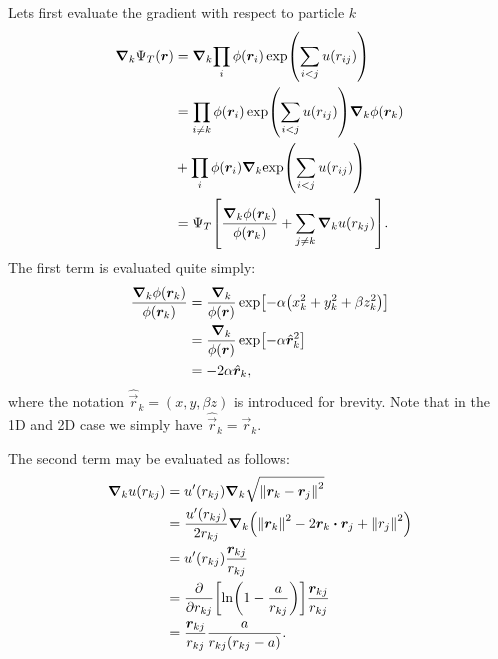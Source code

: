 \documentclass[twocolumn]{article}
\begin{document}
Lets first evaluate the gradient with respect to particle $k$
\begin{align}
    \begin{split}
    \grad_k{\Psi_T(\bm r)}  
    &= \grad_k{\prod_i \phi(\bm r_i)\exp(\sum_{i<j}u(r_{ij}))}\\
    &= \prod_{i\neq k} \phi(\bm r_i)\exp(\sum_{i<j}u(r_{ij}))\grad_k{\phi(\bm
    r_k)}\\
    &+ \prod_{i} \phi(\bm r_i)\grad_k{\exp(\sum_{i<j}u(r_{ij}))}\\
    &= \Psi_T\qty[\frac{\grad_k \phi(\bm r_k)}{\phi(\bm r_k)} + \sum_{j\neq k}
    \grad_k u(r_{kj})].
    \end{split}\label{eq:grad-trail-wf}
\end{align}
The first term is evaluated quite simply:
\begin{align}
    \begin{split}
    \frac{\grad_k\phi(\bm r_k)}{\phi(\bm r_k)} &= \frac{\grad_k}{\phi(\bm r)}
    \exp[-\alpha\qty(x_k^2 + y_k^2 + \beta z_k^2)]\\
    &= \frac{\grad_k}{\phi(\bm r)}\exp[-\alpha\hat{\bm r}_k^2]\\
    &= -2\alpha \hat{\bm r}_k,
    \end{split}\label{eq:grad-phi_k-over-phi_k}
\end{align}
where the notation $\hat{\vec r}_k = (x, y, \beta z)$ is introduced for brevity.
Note that in the 1D and 2D case we simply have $\hat{\vec r}_k = \vec r_k$.


The second term may be evaluated as follows:
\begin{align}
    \begin{split}
    \grad_k u(r_{kj}) &= u'(r_{kj})\grad_k \sqrt{\norm{\vec r_k - \vec r_j}^2} \\
    &= \frac{u'(r_{kj})}{2r_{kj}}\grad_k\qty(\norm{\vec r_k}^2-2\vec r_k\vdot\vec
    r_j+\norm{r_j}^2)\\
    &= u'(r_{kj})\frac{\vec r_{kj}}{r_{kj}}\\
    &= \pdv{}{r_{kj}}\qty[ \ln(1 - \frac{a}{r_{kj}})] \frac{\vec
    r_{kj}}{r_{kj}}\\
    &= \frac{\vec r_{kj}}{r_{kj}}\frac{a}{r_{kj}(r_{kj}-a)}.
    \end{split}\label{eq:grad-u}
\end{align}
\end{document}
